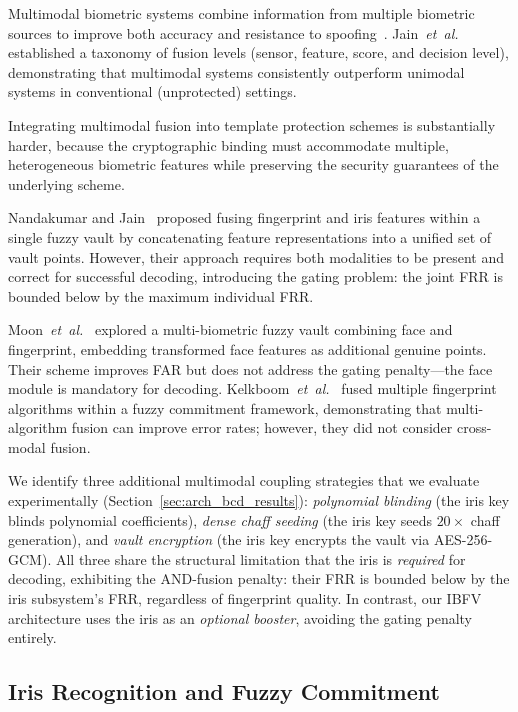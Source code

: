\documentclass[conference]{IEEEtran}
\newcommand{\IBFV}{\textsf{IBFV}}
\begin{document}
Multimodal biometric systems combine information from multiple biometric sources to improve both accuracy and resistance to spoofing~\cite{ross2003information}. Jain~\textit{et~al.}~\cite{jain2004multibiometrics} established a taxonomy of fusion levels (sensor, feature, score, and decision level), demonstrating that multimodal systems consistently outperform unimodal systems in conventional (unprotected) settings.

Integrating multimodal fusion into template protection schemes is substantially harder, because the cryptographic binding must accommodate multiple, heterogeneous biometric features while preserving the security guarantees of the underlying scheme.

Nandakumar and Jain~\cite{nandakumar2008multibiometric} proposed fusing fingerprint and iris features within a single fuzzy vault by concatenating feature representations into a unified set of vault points. However, their approach requires both modalities to be present and correct for successful decoding, introducing the gating problem: the joint FRR is bounded below by the maximum individual FRR.

Moon~\textit{et~al.}~\cite{moon2010multibiometric} explored a multi-biometric fuzzy vault combining face and fingerprint, embedding transformed face features as additional genuine points. Their scheme improves FAR but does not address the gating penalty---the face module is mandatory for decoding. Kelkboom~\textit{et~al.}~\cite{kelkboom2011multialgorithm} fused multiple fingerprint algorithms within a fuzzy commitment framework, demonstrating that multi-algorithm fusion can improve error rates; however, they did not consider cross-modal fusion.

We identify three additional multimodal coupling strategies that we evaluate experimentally (Section~\ref{sec:arch_bcd_results}): \emph{polynomial blinding} (the iris key blinds polynomial coefficients), \emph{dense chaff seeding} (the iris key seeds $20\times$ chaff generation), and \emph{vault encryption} (the iris key encrypts the vault via AES-256-GCM). All three share the structural limitation that the iris is \emph{required} for decoding, exhibiting the AND-fusion penalty: their FRR is bounded below by the iris subsystem's FRR, regardless of fingerprint quality. In contrast, our \IBFV{} architecture uses the iris as an \emph{optional booster}, avoiding the gating penalty entirely.

\subsection{Iris Recognition and Fuzzy Commitment}
\end{document}

